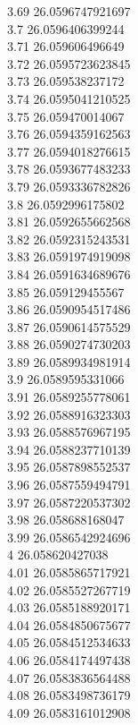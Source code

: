 {3.69	26.0596747921697\\
3.7	26.0596406399244\\
3.71	26.059606496649\\
3.72	26.0595723623845\\
3.73	26.059538237172\\
3.74	26.0595041210525\\
3.75	26.059470014067\\
3.76	26.0594359162563\\
3.77	26.0594018276615\\
3.78	26.0593677483233\\
3.79	26.0593336782826\\
3.8	26.0592996175802\\
3.81	26.0592655662568\\
3.82	26.0592315243531\\
3.83	26.0591974919098\\
3.84	26.0591634689676\\
3.85	26.059129455567\\
3.86	26.0590954517486\\
3.87	26.0590614575529\\
3.88	26.0590274730203\\
3.89	26.0589934981914\\
3.9	26.0589595331066\\
3.91	26.0589255778061\\
3.92	26.0588916323303\\
3.93	26.0588576967195\\
3.94	26.0588237710139\\
3.95	26.0587898552537\\
3.96	26.0587559494791\\
3.97	26.0587220537302\\
3.98	26.058688168047\\
3.99	26.0586542924696\\
4	26.058620427038\\
4.01	26.0585865717921\\
4.02	26.0585527267719\\
4.03	26.0585188920171\\
4.04	26.0584850675677\\
4.05	26.0584512534633\\
4.06	26.0584174497438\\
4.07	26.0583836564488\\
4.08	26.0583498736179\\
4.09	26.0583161012908\\
}
